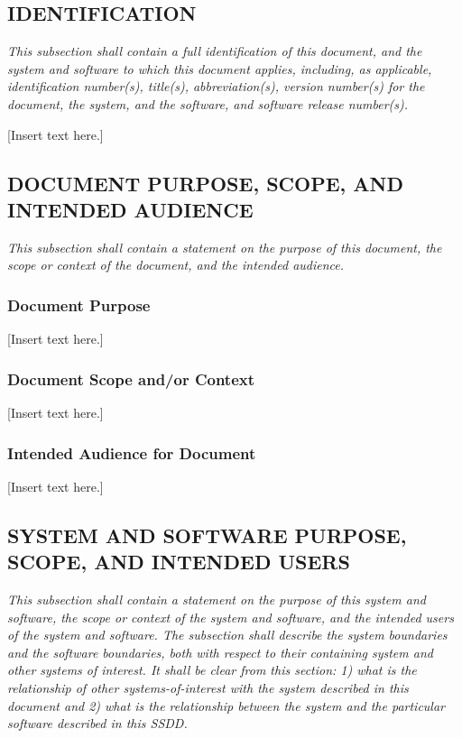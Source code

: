 \documentclass[twoside,letterpaper]{article}
\begin{document}
\subsection{IDENTIFICATION}
{\itshape\color{black}
This subsection shall contain a full identification of this document,
and the system and software to which this document applies, including,
as applicable, identification number(s), title(s), abbreviation(s),
version number(s) for the document, the system, and the software, and
software release number(s).}

[Insert text here.]

\subsection{DOCUMENT PURPOSE, SCOPE, AND INTENDED AUDIENCE}
{\itshape\color{black}
This subsection shall contain a statement on the purpose of this
document, the scope or context of the document, and the intended
audience.}

\subsubsection{Document Purpose}

[Insert text here.]

\subsubsection{Document Scope and/or Context}

[Insert text here.]

\subsubsection{Intended Audience for Document}

[Insert text here.]

\subsection{SYSTEM AND SOFTWARE PURPOSE, SCOPE, AND INTENDED USERS}
{\itshape\color{black}
This subsection shall contain a statement on the purpose of this system
and software, the scope or context of the system and software, and the
intended users of the system and software. The subsection shall
describe the system boundaries and the software boundaries, both with
respect to their containing system and other systems of interest. It
shall be clear from this section: 1) what is the relationship of other
systems-of-interest with the system described in this document and 2)
what is the relationship between the system and the particular software
described in this SSDD.}
\end{document}

